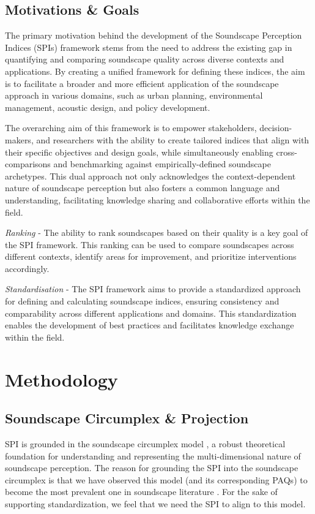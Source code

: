 \documentclass[
  authoryear,
  preprint,
  3p]{elsarticle}
\begin{document}
\subsection{Motivations \& Goals}\label{motivations-goals}

The primary motivation behind the development of the Soundscape
Perception Indices (SPIs) framework stems from the need to address the
existing gap in quantifying and comparing soundscape quality across
diverse contexts and applications. By creating a unified framework for
defining these indices, the aim is to facilitate a broader and more
efficient application of the soundscape approach in various domains,
such as urban planning, environmental management, acoustic design, and
policy development.

The overarching aim of this framework is to empower stakeholders,
decision-makers, and researchers with the ability to create tailored
indices that align with their specific objectives and design goals,
while simultaneously enabling cross-comparisons and benchmarking against
empirically-defined soundscape archetypes. This dual approach not only
acknowledges the context-dependent nature of soundscape perception but
also fosters a common language and understanding, facilitating knowledge
sharing and collaborative efforts within the field.

\emph{Ranking} - The ability to rank soundscapes based on their quality
is a key goal of the SPI framework. This ranking can be used to compare
soundscapes across different contexts, identify areas for improvement,
and prioritize interventions accordingly.

\emph{Standardisation} - The SPI framework aims to provide a
standardized approach for defining and calculating soundscape indices,
ensuring consistency and comparability across different applications and
domains. This standardization enables the development of best practices
and facilitates knowledge exchange within the field.

\section{Methodology}\label{methodology}

\subsection{Soundscape Circumplex \&
Projection}\label{soundscape-circumplex-projection}

SPI is grounded in the soundscape circumplex model
\citep{Axelsson2010principal, Axelsson2012Swedish}, a robust theoretical
foundation for understanding and representing the multi-dimensional
nature of soundscape perception. The reason for grounding the SPI into
the soundscape circumplex is that we have observed this model (and its
corresponding PAQs) to become the most prevalent one in soundscape
literature \citep{Aletta2023Adoption}. For the sake of supporting
standardization, we feel that we need the SPI to align to this model.
\end{document}
